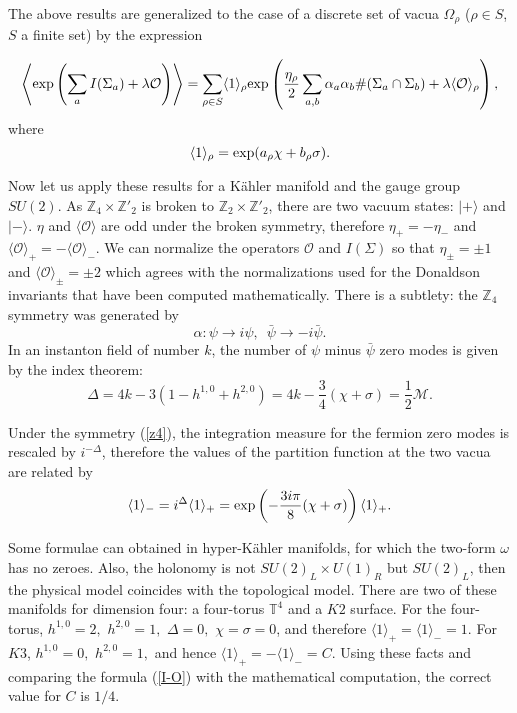 \documentclass[12pt, onecolumn]{article}
\begin{document}
The above results are generalized to the case of a discrete set of vacua $\Omega_\rho$ ($\rho \in S$, $S$ a finite set) by the expression 

\begin{equation}
 \left\langle {\rm exp} \left(\sum_a I(\Sigma_a)+\lambda \mathcal{O}\right) \right\rangle  = \sum_{\rho \in S} \langle 1 \rangle_\rho {\rm exp} \left( \frac{\eta_\rho}{2} \sum_{a,b} \alpha_a \alpha_b \#(\Sigma_a \cap \Sigma_b) + \lambda \langle \mathcal{O} \rangle_\rho\right), \label{I-O}
\end{equation} where 
\begin{equation}
\langle 1 \rangle_\rho = {\rm exp}(a_\rho \chi + b_\rho \sigma).
\end{equation}

Now let us apply these results for a K\"ahler manifold and the gauge group $SU(2)$. As $\mathbb{Z}_4\times \mathbb{Z}'_2$ is broken to $\mathbb{Z}_2\times \mathbb{Z}'_2$, there are two vacuum states: $|+\rangle$ and $|-\rangle$.  $\eta$ and $\langle \mathcal{O}\rangle$ are odd under the broken symmetry, therefore $\eta_+=-\eta_-$ and $\langle\mathcal{O}\rangle_+=-\langle\mathcal{O}\rangle_-$. We can normalize the operators $\mathcal{O}$ and $I(\Sigma)$ so that $\eta_\pm = \pm 1$ and $\langle\mathcal{O}\rangle_\pm = \pm 2$ which agrees with the normalizations used for the Donaldson invariants that have been computed mathematically. There is a subtlety: the $\mathbb{Z}_4$ symmetry was generated by 
\begin{equation}
\alpha: \psi \rightarrow i\psi,\,\,\,\bar{\psi}\rightarrow -i \bar{\psi}. \label{z4}
\end{equation} 
In an instanton field of number $k$, the number of $\psi$ minus $\bar{\psi}$ zero modes is given by the index theorem:
\begin{equation}
\Delta =  4k-3(1-h^{1,0}+h^{2,0})=4k-\frac{3}{4}(\chi+\sigma)=\frac{1}{2}\mathcal{M}.
\end{equation}

Under the symmetry (\ref{z4}), the integration measure for the fermion zero modes is rescaled by $i^{-\Delta}$, therefore the values of the partition function at the two vacua are related by
\begin{equation}
\langle 1 \rangle_- = i^{\Delta} \langle 1 \rangle_+ = {\rm exp} \left(-\frac{3i\pi}{8}(\chi + \sigma)\right)\langle 1 \rangle_+.
\end{equation}

Some formulae can obtained in hyper-K\"ahler manifolds, for which the two-form $\omega$ has no zeroes. Also, the  holonomy is not $SU(2)_L\times U(1)_R$ but $SU(2)_L$, then the physical model coincides with the topological model.  There are two of these manifolds for dimension four: a four-torus $\mathbb{T}^4$ and a $K2$ surface. For the four-torus, $h^{1,0}=2,\,\,h^{2,0}=1, \,\,\Delta = 0,\,\,\chi=\sigma=0$, and therefore $\langle 1 \rangle_+=\langle 1 \rangle_-=1$. For $K3$, $h^{1,0}=0, \,\,h^{2,0}=1,$ and hence $\langle 1 \rangle_+=-\langle 1 \rangle_-=C$. Using these facts and comparing the formula (\ref{I-O}) with the mathematical computation, the correct value for $C$ is $1/4$.
\end{document}
